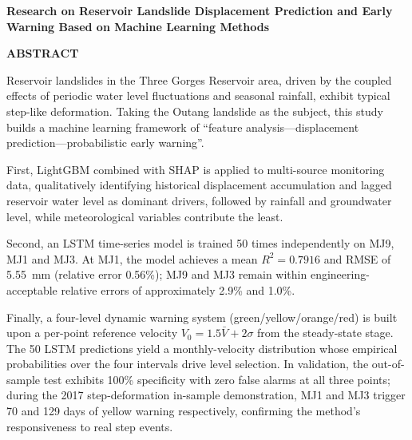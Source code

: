 \documentclass[12pt,a4paper]{article}
\begin{document}
\newpage

\thispagestyle{plain}

\begin{center}
  {\fontsize{16pt}{20pt}\selectfont\rmfamily\bfseries
  Research on Reservoir Landslide Displacement Prediction and Early Warning Based on Machine Learning Methods}
\end{center}

\vspace{\baselineskip}

\begin{center}
  {\fontsize{16pt}{20pt}\selectfont\rmfamily\bfseries ABSTRACT}
\end{center}

\vspace{\baselineskip}

{\fontsize{12pt}{14.5pt}\selectfont\rmfamily
\noindent\hspace{2em}Reservoir landslides in the Three Gorges Reservoir area, driven by the coupled effects of periodic water level fluctuations and seasonal rainfall, exhibit typical step-like deformation. Taking the Outang landslide as the subject, this study builds a machine learning framework of ``feature analysis---displacement prediction---probabilistic early warning''.

\noindent\hspace{2em}First, LightGBM combined with SHAP is applied to multi-source monitoring data, qualitatively identifying historical displacement accumulation and lagged reservoir water level as dominant drivers, followed by rainfall and groundwater level, while meteorological variables contribute the least.

\noindent\hspace{2em}Second, an LSTM time-series model is trained 50 times independently on MJ9, MJ1 and MJ3. At MJ1, the model achieves a mean $R^2 = 0.7916$ and RMSE of 5.55~mm (relative error 0.56\%); MJ9 and MJ3 remain within engineering-acceptable relative errors of approximately 2.9\% and 1.0\%.

\noindent\hspace{2em}Finally, a four-level dynamic warning system (green/yellow/orange/red) is built upon a per-point reference velocity $V_0 = 1.5\bar V + 2\sigma$ from the steady-state stage. The 50 LSTM predictions yield a monthly-velocity distribution whose empirical probabilities over the four intervals drive level selection. In validation, the out-of-sample test exhibits 100\% specificity with zero false alarms at all three points; during the 2017 step-deformation in-sample demonstration, MJ1 and MJ3 trigger 70 and 129 days of yellow warning respectively, confirming the method's responsiveness to real step events.
}
\end{document}
